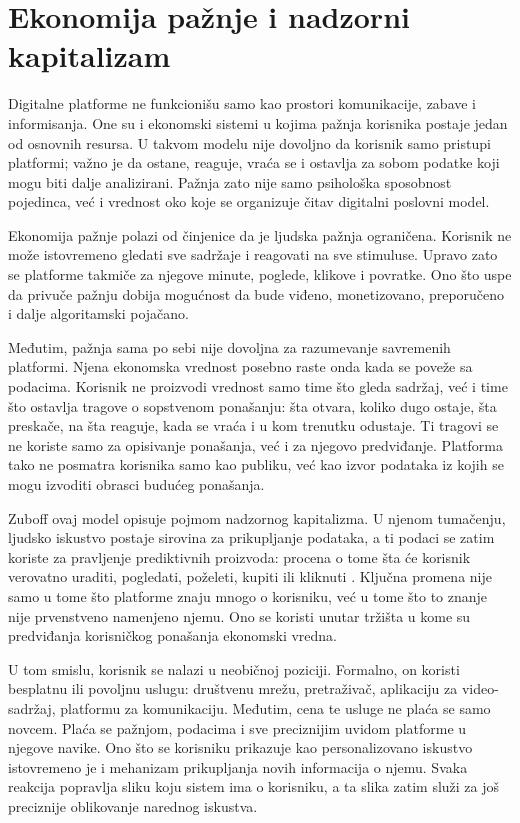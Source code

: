 \section{Ekonomija pažnje i nadzorni kapitalizam}

Digitalne platforme ne funkcionišu samo kao prostori komunikacije, zabave i informisanja. One su i ekonomski sistemi u kojima pažnja korisnika postaje jedan od osnovnih resursa. U takvom modelu nije dovoljno da korisnik samo pristupi platformi; važno je da ostane, reaguje, vraća se i ostavlja za sobom podatke koji mogu biti dalje analizirani. Pažnja zato nije samo psihološka sposobnost pojedinca, već i vrednost oko koje se organizuje čitav digitalni poslovni model.

Ekonomija pažnje polazi od činjenice da je ljudska pažnja ograničena. Korisnik ne može istovremeno gledati sve sadržaje i reagovati na sve stimuluse. Upravo zato se platforme takmiče za njegove minute, poglede, klikove i povratke. Ono što uspe da privuče pažnju dobija mogućnost da bude viđeno, monetizovano, preporučeno i dalje algoritamski pojačano.

Međutim, pažnja sama po sebi nije dovoljna za razumevanje savremenih platformi. Njena ekonomska vrednost posebno raste onda kada se poveže sa podacima. Korisnik ne proizvodi vrednost samo time što gleda sadržaj, već i time što ostavlja tragove o sopstvenom ponašanju: šta otvara, koliko dugo ostaje, šta preskače, na šta reaguje, kada se vraća i u kom trenutku odustaje. Ti tragovi se ne koriste samo za opisivanje ponašanja, već i za njegovo predviđanje. Platforma tako ne posmatra korisnika samo kao publiku, već kao izvor podataka iz kojih se mogu izvoditi obrasci budućeg ponašanja.

Zuboff ovaj model opisuje pojmom nadzornog kapitalizma. U njenom tumačenju, ljudsko iskustvo postaje sirovina za prikupljanje podataka, a ti podaci se zatim koriste za pravljenje prediktivnih proizvoda: procena o tome šta će korisnik verovatno uraditi, pogledati, poželeti, kupiti ili kliknuti \cite{zuboff2015bigother}. Ključna promena nije samo u tome što platforme znaju mnogo o korisniku, već u tome što to znanje nije prvenstveno namenjeno njemu. Ono se koristi unutar tržišta u kome su predviđanja korisničkog ponašanja ekonomski vredna.

U tom smislu, korisnik se nalazi u neobičnoj poziciji. Formalno, on koristi besplatnu ili povoljnu uslugu: društvenu mrežu, pretraživač, aplikaciju za video-sadržaj, platformu za komunikaciju. Međutim, cena te usluge ne plaća se samo novcem. Plaća se pažnjom, podacima i sve preciznijim uvidom platforme u njegove navike. Ono što se korisniku prikazuje kao personalizovano iskustvo istovremeno je i mehanizam prikupljanja novih informacija o njemu. Svaka reakcija popravlja sliku koju sistem ima o korisniku, a ta slika zatim služi za još preciznije oblikovanje narednog iskustva.

